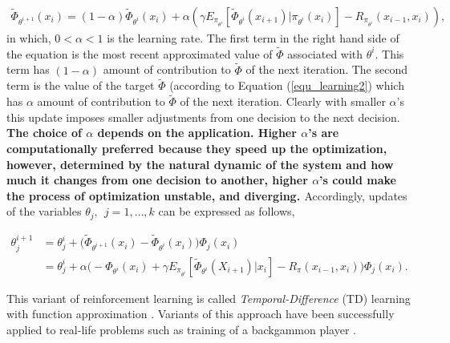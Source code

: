\documentclass[12pt]{aastex62}
\theoremstyle{definition}
\begin{document}
\begin{equation}\label{equ_updatePHI}
\begin{aligned}
\tilde \Phi_{\theta^{i+1}}(x_{{i}}) = (1-\alpha) \tilde \Phi_{\theta^{i}}(x_{{i}})+ \alpha  ( \gamma  E_{\pi_{\theta^i}}[\tilde \Phi_{\theta^{i}}(x_{{i+1}})|\pi_{\theta^{i}}(x_{{i}})] -R_{\pi_{\theta^i}}(x_{i-1},x_i) ),
\end{aligned}
\end{equation}
in which, $0<\alpha<1$ is the learning rate. The first term in the right hand side of the equation is the most recent approximated value of $\tilde \Phi$ associated with $\theta^i$. This term has $(1-\alpha)$ amount of contribution to $\tilde \Phi$ of the next iteration. The second term is the value of the target $\tilde \Phi$ (according to Equation (\ref{equ_learning2}) which has $\alpha$ amount of contribution to $\tilde \Phi$ of the next iteration. Clearly with smaller $\alpha$'s this update imposes smaller adjustments from one decision to the next decision. {\bf The choice of $\alpha$ depends on the application. Higher $\alpha$'s are computationally preferred because they speed up the optimization, however, determined by the natural dynamic of the system and how much it changes from one decision to another, higher $\alpha$'s could make the process of optimization unstable, and diverging. \bf} Accordingly, updates of the variables $\theta_j,~~j=1,\dots, k$ can be expressed as follows, 

\begin{equation} \label{equ_TD_update}
\begin{aligned}
\theta_j^{i+1} &= \theta_j^{i} + \Big( \tilde \Phi_{\theta^{i+1}}(x_{{i}})  - \tilde \Phi_{\theta^{i}}(x_{{i}}) \Big)\Phi_j(x_{i})\\
& = \theta_j^{i} + \alpha \Big(-\Phi_{\theta^{i}}(x_{{i}}) + \gamma  E_{\pi_{\theta^i}}[\tilde \Phi_{\theta^{i}}(X_{{i+1}})|x_{{i}}] -R_{\pi}(x_{i-1},x_i)  \Big)\Phi_j(x_{i}).
\end{aligned}
\end{equation}

This variant of reinforcement learning is called \textit{Temporal-Difference} (TD) learning with function approximation \citep{tsitsiklis1997analysis}. Variants of this approach have been successfully applied to real-life problems such as training of a backgammon player \citep{tesauro1995temporal}.
\end{document}
